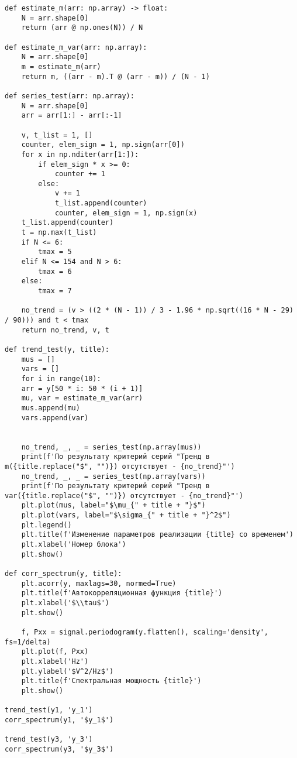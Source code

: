{
	\vspace{-1.5em}
	\label{stationary_prog}
	\begin{verbatim}
def estimate_m(arr: np.array) -> float:
	N = arr.shape[0]
	return (arr @ np.ones(N)) / N

def estimate_m_var(arr: np.array):
	N = arr.shape[0]
	m = estimate_m(arr)
	return m, ((arr - m).T @ (arr - m)) / (N - 1) 

def series_test(arr: np.array):
	N = arr.shape[0]
	arr = arr[1:] - arr[:-1]

	v, t_list = 1, []
	counter, elem_sign = 1, np.sign(arr[0])
	for x in np.nditer(arr[1:]):
		if elem_sign * x >= 0:
			counter += 1
		else:
			v += 1
			t_list.append(counter)
			counter, elem_sign = 1, np.sign(x)
	t_list.append(counter)
	t = np.max(t_list)
	if N <= 6:
		tmax = 5
	elif N <= 154 and N > 6:
		tmax = 6
	else:
		tmax = 7

	no_trend = (v > ((2 * (N - 1)) / 3 - 1.96 * np.sqrt((16 * N - 29) / 90))) and t < tmax
	return no_trend, v, t

def trend_test(y, title):
	mus = []
	vars = []
	for i in range(10):
	arr = y[50 * i: 50 * (i + 1)]
	mu, var = estimate_m_var(arr)
	mus.append(mu)
	vars.append(var)


	no_trend, _, _ = series_test(np.array(mus))    
	print(f'По результату критерий серий "Тренд в m({title.replace("$", "")}) отсутствует - {no_trend}"')
	no_trend, _, _ = series_test(np.array(vars))    
	print(f'По результату критерий серий "Тренд в var({title.replace("$", "")}) отсутствует - {no_trend}"')
	plt.plot(mus, label="$\mu_{" + title + "}$")
	plt.plot(vars, label="$\sigma_{" + title + "}^2$")
	plt.legend()
	plt.title(f'Изменение параметров реализации {title} со временем')
	plt.xlabel('Номер блока')
	plt.show()

def corr_spectrum(y, title):
	plt.acorr(y, maxlags=30, normed=True)
	plt.title(f'Автокорреляционная функция {title}')
	plt.xlabel('$\\tau$')
	plt.show()

	f, Pxx = signal.periodogram(y.flatten(), scaling='density', fs=1/delta)
	plt.plot(f, Pxx)
	plt.xlabel('Hz')
	plt.ylabel('$V^2/Hz$')
	plt.title(f'Спектральная мощность {title}')
	plt.show()

trend_test(y1, 'y_1')
corr_spectrum(y1, '$y_1$')

trend_test(y3, 'y_3')
corr_spectrum(y3, '$y_3$')


\end{verbatim}}
